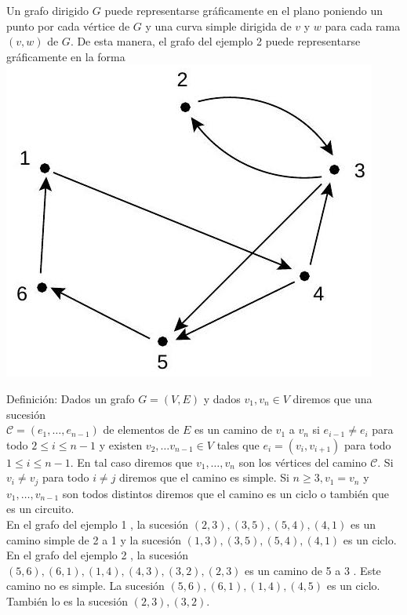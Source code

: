 \documentclass[10pt]{article}
\begin{document}
Un grafo dirigido $G$ puede representarse gráficamente en el plano poniendo un punto por cada vértice de $G$ y una curva simple dirigida de $v$ y $w$ para cada rama $(v, w)$ de $G$. De esta manera, el grafo del ejemplo 2 puede representarse gráficamente en la forma\\
\includegraphics[max width=\textwidth, center]{2025_09_05_b69e29efaf9a6d2aa81ag-04(1)}

Definición: Dados un grafo $G=(V, E)$ y dados $v_{1}, v_{n} \in V$ diremos que una sucesión\\
$\mathcal{C}=\left(e_{1}, \ldots, e_{n-1}\right)$ de elementos de $E$ es un camino de $v_{1}$ a $v_{n}$ si $e_{i-1} \neq e_{i}$ para todo $2 \leq i \leq n-1$ y existen $v_{2}, \ldots v_{n-1} \in V$ tales que $e_{i}=\left(v_{i}, v_{i+1}\right)$ para todo $1 \leq i \leq n-1$. En tal caso diremos que $v_{1}, \ldots, v_{n}$ son los vértices del camino $\mathcal{C}$. Si $v_{i} \neq v_{j}$ para todo $i \neq j$ diremos que el camino es simple. Si $n \geq 3, v_{1}=v_{n}$ y $v_{1}, \ldots, v_{n-1}$ son todos distintos diremos que el camino es un ciclo o también que es un circuito.\\
En el grafo del ejemplo 1 , la sucesión $(2,3),(3,5),(5,4),(4,1)$ es un camino simple de 2 a 1 y la sucesión $(1,3),(3,5),(5,4),(4,1)$ es un ciclo. En el grafo del ejemplo 2 , la sucesión $(5,6),(6,1),(1,4),(4,3),(3,2),(2,3)$ es un camino de 5 a 3 . Este camino no es simple. La sucesión $(5,6),(6,1),(1,4),(4,5)$ es un ciclo. También lo es la sucesión $(2,3),(3,2)$.
\end{document}
